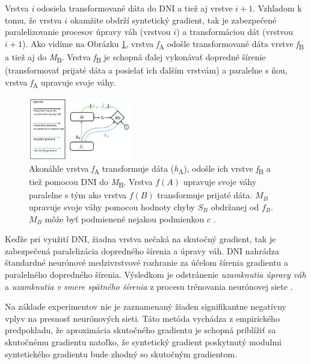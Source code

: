 Vrstva \textit{i} odosiela transformované dáta do DNI a tiež aj vrstve $i+1$. Vzhľadom k tomu, že vrstva $i$ okamžite obdrží syntetický gradient, tak je zabezpečené paralelizovanie procesov úpravy váh (vrstvou $i$) a transformáciou dát (vrstvou $i+1$). Ako vidíme na Obrázku \ref{komunikaciaDNI}, vrstva \textit{f}\textsubscript{A} odošle transformované dáta vrstve \textit{f}\textsubscript{B} a tiež aj do \textit{M}\textsubscript{B}. Vrstva \textit{f}\textsubscript{B} je schopná ďalej vykonávať dopredné šírenie (transformovať prijaté dáta a posielať ich ďalším vrstvám) a paralelne s ňou, vrstva \textit{f}\textsubscript{A} upravuje svoje váhy.

\begin{figure}
\centerline{\includegraphics[width=0.4\textwidth]{images/DNI}}
\caption[Komunikácia vrstiev s DNI]{Akonáhle vrstva \textit{f}\textsubscript{A} transformuje dáta (\textit{h}\textsubscript{A}), odošle ich vrstve \textit{f}\textsubscript{B} a tiež pomocou DNI do \textit{M}\textsubscript{B}. Vrstva $f(A)$ upravuje svoje váhy paralelne s tým ako vrstva $f(B)$ transformuje prijaté dáta. $M_B$ upravuje svoje váhy pomocou hodnoty chyby $S_B$ obdržanej od $f_B$. $M_B$ môže byť podmienené nejakou podmienkou $c$ \cite{Jaderberg2016}.}
\label{komunikaciaDNI}
\end{figure}

Keďže pri využití DNI, žiadna vrstva nečaká na skutočný gradient, tak je zabezpečená paralelizácia dopredného šírenia a úpravy váh. DNI nahrádza štandardné neurónové medzivrstvové rozhranie za účelom šírenia gradientu a paralelného dopredného šírenia. Výsledkom je odstránenie \textit{uzamknutia úpravy váh} a \textit{uzamknutia v smere spätného šírenia} z procesu trénovania neurónovej siete \cite{Jaderberg2016}.

Na základe experimentov \cite{Jaderberg2016, Czarnecki2017} nie je zaznamenaný žiaden signifikantne negatívny vplyv na presnosť neurónových sieti. Táto metóda vychádza z empirického predpokladu, že aproximácia skutočného gradientu je schopná priblížiť sa skutočnému gradientu natoľko, že syntetický gradient poskytnutý modulmi syntetického gradientu bude zhodný so skutočným gradientom. 

